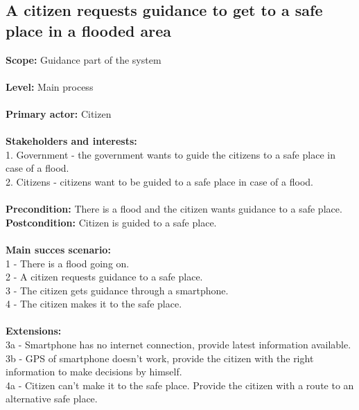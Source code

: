 \subsection{A citizen requests guidance to get to a safe place in a flooded area}
\textbf{Scope:} Guidance part of the system\\\\
\textbf{Level:} Main process\\\\
\textbf{Primary actor:} Citizen\\\\
\textbf{Stakeholders and interests:}\\
	1. Government - the government wants to guide the citizens to a safe place in case of a flood. \\
	2. Citizens - citizens want to be guided to a safe place in case of a flood. \\\\
\textbf{Precondition:} There is a flood and the citizen wants guidance to a safe place. \\
\textbf{Postcondition:} Citizen is guided to a safe place. \\\\
\textbf{Main succes scenario:} \\
1 - There is a flood going on.\\
2 - A citizen requests guidance to a safe place.\\
3 - The citizen gets guidance through a smartphone.\\
4 - The citizen makes it to the safe place.\\\\
\textbf{Extensions:} \\
3a - Smartphone has no internet connection, provide latest information available.\\
3b - GPS of smartphone doesn't work, provide the citizen with the right information to make decisions by himself.\\
4a - Citizen can't make it to the safe place. Provide the citizen with a route to an alternative safe place.

